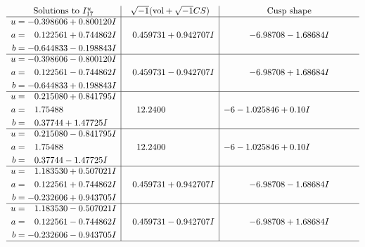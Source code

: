 \documentclass[1p]{elsarticle_modified}
\theoremstyle{definition}
\newcommand{\I}{\sqrt{-1}}
\begin{document}
$$\begin{array}{c|c|c}  
\text{Solutions to }I^u_{17}& \I (\text{vol} + \sqrt{-1}CS) & \text{Cusp shape}\\
 \hline 
\begin{aligned}
u &= -0.398606 + 0.800120 I \\
a &= \phantom{-}0.122561 + 0.744862 I \\
b &= -0.644833 - 0.198843 I\end{aligned}
 & \phantom{-}0.459731 + 0.942707 I & -6.98708 - 1.68684 I \\ \hline\begin{aligned}
u &= -0.398606 - 0.800120 I \\
a &= \phantom{-}0.122561 - 0.744862 I \\
b &= -0.644833 + 0.198843 I\end{aligned}
 & \phantom{-}0.459731 - 0.942707 I & -6.98708 + 1.68684 I \\ \hline\begin{aligned}
u &= \phantom{-}0.215080 + 0.841795 I \\
a &= \phantom{-}1.75488\phantom{ +0.000000I} \\
b &= \phantom{-}0.37744 + 1.47725 I\end{aligned}
 & \phantom{-}12.2400\phantom{ +0.000000I} &                  -6
-1.025846 + 0. 10   I\phantom{ +0.000000I} \\ \hline\begin{aligned}
u &= \phantom{-}0.215080 - 0.841795 I \\
a &= \phantom{-}1.75488\phantom{ +0.000000I} \\
b &= \phantom{-}0.37744 - 1.47725 I\end{aligned}
 & \phantom{-}12.2400\phantom{ +0.000000I} &                  -6
-1.025846 + 0. 10   I\phantom{ +0.000000I} \\ \hline\begin{aligned}
u &= \phantom{-}1.183530 + 0.507021 I \\
a &= \phantom{-}0.122561 + 0.744862 I \\
b &= -0.232606 + 0.943705 I\end{aligned}
 & \phantom{-}0.459731 + 0.942707 I & -6.98708 - 1.68684 I \\ \hline\begin{aligned}
u &= \phantom{-}1.183530 - 0.507021 I \\
a &= \phantom{-}0.122561 - 0.744862 I \\
b &= -0.232606 - 0.943705 I\end{aligned}
 & \phantom{-}0.459731 - 0.942707 I & -6.98708 + 1.68684 I\\
 \hline 
 \end{array}$$\newpage\newpage\renewcommand{\arraystretch}{1}
\end{document}

